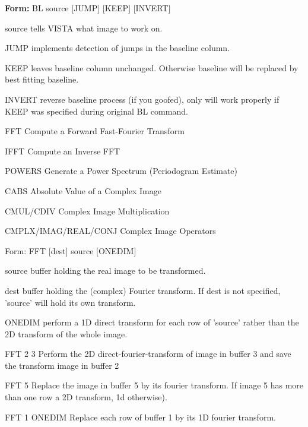 {\newpage\clearpage
{}%
\begin{command}
  \item[\textbf{Form: }BL source {[JUMP]} {[KEEP]} {[INVERT]}\hfill]{}
  \item[source]{tells VISTA what image to work on.}
  \item[JUMP]{implements detection of jumps in the baseline column.}
  \item[KEEP]{leaves baseline column unchanged. Otherwise
       baseline will be replaced by best fitting baseline.}
  \item[INVERT]{reverse baseline process (if you goofed), only
                will work properly if KEEP was specified during
                original BL command.}
\end{command}%
\lthtmlfigureZ
\lthtmlcheckvsize\clearpage}

{\newpage\clearpage
{}%
\begin{example}
  \item[FFT]{Compute a Forward Fast-Fourier Transform}
  \item[IFFT]{Compute an Inverse FFT}
  \item[POWERS]{Generate a Power Spectrum (Periodogram Estimate)}
  \item[CABS]{Absolute Value of a Complex Image}
  \item[CMUL/CDIV]{Complex Image Multiplication}
  \item[CMPLX/IMAG/REAL/CONJ]{Complex Image Operators}
\end{example}%
\lthtmlfigureZ
\lthtmlcheckvsize\clearpage}

{\newpage\clearpage
{}%
\begin{command}
  \item[Form: FFT  {[dest]} source {[ONEDIM]}\hfill]{}
  \item[source]{buffer holding the real image to be transformed.}
  \item[dest]{buffer holding the (complex) Fourier transform. If dest
       is not specified, 'source' will hold its own transform.}
  \item[ONEDIM]{perform a 1D direct transform for each row of 'source'
       rather than the 2D transform of the whole image.}
\end{command}%
\lthtmlfigureZ
\lthtmlcheckvsize\clearpage}

{\newpage\clearpage
{}%
\begin{example}
  \item[FFT 2 3\hfill]{Perform the 2D direct-fourier-transform of 
       image in buffer 3 and save the transform image in buffer 2}
  \item[FFT 5\hfill]{Replace the image in buffer 5 by its fourier transform. 
       If image 5 has more than one row a 2D transform, 1d otherwise).}
  \item[FFT 1 ONEDIM\hfill]{Replace each row of buffer 1 by its 1D fourier 
       transform.}
\end{example}%
\lthtmlfigureZ
\lthtmlcheckvsize\clearpage}

